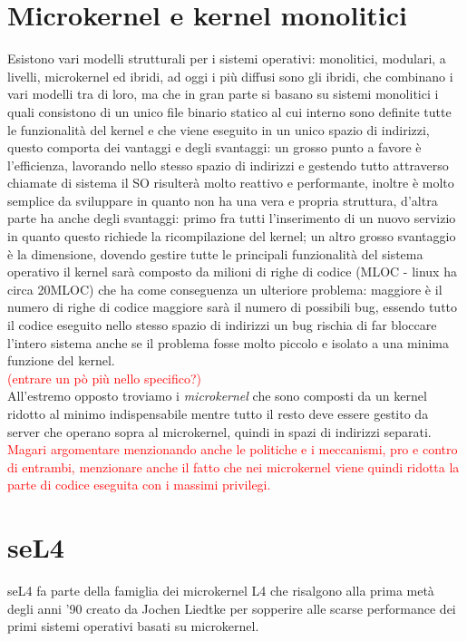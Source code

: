 \section{Microkernel e kernel monolitici}
Esistono vari modelli strutturali per i sistemi operativi: monolitici, modulari, a livelli, microkernel ed ibridi, ad oggi i più diffusi sono gli ibridi, che combinano i vari modelli tra di loro, ma che in gran parte si basano su sistemi monolitici i quali consistono di un unico file binario statico al cui interno sono definite tutte le funzionalità del kernel e che viene eseguito in un unico spazio di indirizzi, questo comporta dei vantaggi e degli svantaggi: un grosso punto a favore è  l'efficienza, lavorando nello stesso spazio di indirizzi e gestendo tutto attraverso chiamate di sistema il SO risulterà molto reattivo e performante, inoltre è molto semplice da sviluppare in quanto non ha una vera e propria struttura, d'altra parte ha anche degli svantaggi: primo fra tutti l'inserimento di un nuovo servizio in quanto questo richiede la ricompilazione del kernel; un altro grosso svantaggio è la dimensione, dovendo gestire tutte le principali funzionalità del sistema operativo il kernel sarà composto da milioni di righe di codice (MLOC - linux ha circa 20MLOC) che ha come conseguenza un ulteriore problema: maggiore è il numero di righe di codice maggiore sarà il numero di possibili bug, essendo tutto il codice eseguito nello stesso spazio di indirizzi un bug rischia di far bloccare l'intero sistema anche se il problema fosse molto piccolo e isolato a una minima funzione del kernel.\\
\textcolor{red}{(entrare un pò più nello specifico?)}\\
All'estremo opposto troviamo i \textit{microkernel} che sono composti da un kernel ridotto al minimo indispensabile mentre tutto il resto deve essere gestito da server che operano sopra al microkernel, quindi in spazi di indirizzi separati.\\
\textcolor{red}{Magari argomentare menzionando anche le politiche e i meccanismi, pro e contro di entrambi, menzionare anche il fatto che nei microkernel viene quindi ridotta la parte di codice eseguita con i massimi privilegi.}\\

\section{seL4}
seL4 fa parte della famiglia dei microkernel L4 che risalgono alla prima metà degli anni '90 creato da Jochen Liedtke per sopperire alle scarse performance dei primi sistemi operativi basati su microkernel.
